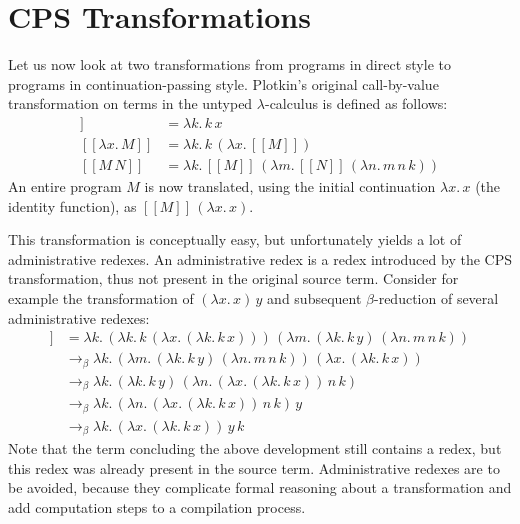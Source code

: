 \documentclass[a4paper,11pt,draft]{article}
\begin{document}
\section{CPS Transformations}\label{sec:transformations}

Let us now look at two transformations from programs in direct style to programs in
continuation-passing style. Plotkin's original call-by-value transformation on terms
in the untyped $\lambda$-calculus is defined as follows:
\begin{align*}
  [\![x]\!]               &= \lambda k. \, k \, x\\
  [\![\lambda x. \, M]\!] &= \lambda k. \, k \, (\lambda x. \, [\![M]\!])\\
  [\![M \, N]\!]          &= \lambda k. \, [\![M]\!] \, (\lambda m. \, [\![N]\!] \, (\lambda n. \, m \, n \, k))
\end{align*}
An entire program $M$ is now translated, using the initial continuation
$\lambda x. \, x$ (the identity function), as
$[\![M]\!] \, (\lambda x. \, x)$.

This transformation is conceptually easy, but unfortunately yields a lot of
administrative redexes. An administrative redex is a redex introduced by the CPS
transformation, thus not present in the original source term. Consider for example
the transformation of $(\lambda x. \, x) \, y$ and subsequent $\beta$-reduction
of several administrative redexes:
\begin{align*}
  [\![(\lambda x. \, x) \, y]\!] &= \lambda k. \, (\lambda k. \, k \, (\lambda x. \, (\lambda k. \, k \, x))) \, (\lambda m. \, (\lambda k. \, k \, y) \,
 (\lambda n. \, m \, n \, k))\\
                                 &\rightarrow_{\beta} \lambda k. \, (\lambda m. \, (\lambda k. \, k \, y) \, (\lambda n. \, m \, n \, k)) \, (\lambda x.
\, (\lambda k. \, k \, x))\\
                                 &\rightarrow_{\beta} \lambda k. \, (\lambda k. \, k \, y) \, (\lambda n. \, (\lambda x. \, (\lambda k. \, k \, x)) \, n
\, k)\\
                                 &\rightarrow_{\beta} \lambda k. \, (\lambda n. \, (\lambda x. \, (\lambda k. \, k \, x)) \, n \, k) \, y\\
                                 &\rightarrow_{\beta} \lambda k. \, (\lambda x. \, (\lambda k. \, k \, x)) \, y \, k
\end{align*}
Note that the term concluding the above development still contains a redex, but
this redex was already present in the source term.
Administrative redexes are to be avoided, because they complicate formal
reasoning about a transformation and add computation steps to a compilation
process.
\end{document}
